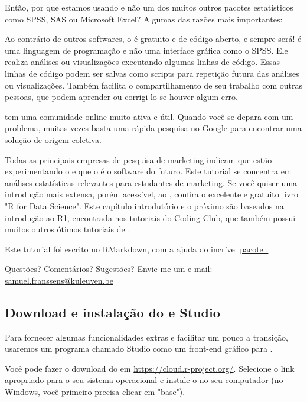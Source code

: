 \documentclass{article}
\begin{document}
Então, por que estamos usando \faRProject e não um dos muitos outros pacotes estatísticos como SPSS, SAS ou Microsoft Excel? Algumas das razões mais importantes:

Ao contrário de outros softwares, o \faRProject é gratuito e de código aberto, e sempre será!
\faRProject é uma linguagem de programação e não uma interface gráfica como o SPSS. Ele realiza análises ou visualizações executando algumas linhas de código. Essas linhas de código podem ser salvas como scripts para repetição futura das análises ou visualizações. Também facilita o compartilhamento de seu trabalho com outras pessoas, que podem aprender ou corrigi-lo se houver algum erro.

\faRProject tem uma comunidade online muito ativa e útil. Quando você se depara com um problema, muitas vezes basta uma rápida pesquisa no Google para encontrar uma solução de origem coletiva.


Todas as principais empresas de pesquisa de marketing indicam que estão experimentando o \faRProject e que o \faRProject é o software do futuro.
Este tutorial se concentra em análises estatísticas relevantes para estudantes de marketing. Se você quiser uma introdução mais extensa, porém acessível, ao \faRProject, confira o excelente e gratuito livro "\href{http://r4ds.had.co.nz/index.html}{R for Data Science}". Este capítulo introdutório e o próximo são baseados na introdução ao R1, encontrada nos tutoriais do \href{https://ourcodingclub.github.io/}{Coding Club}, que também possui muitos outros ótimos tutoriais de \faRProject.

Este tutorial foi escrito no RMarkdown, com a ajuda do incrível \href{https://bookdown.org/yihui/bookdown/}{pacote .}

Questões? Comentários? Sugestões? Envie-me um e-mail: \href{mailto:samuel.franssens@kuleuven.be}{samuel.franssens@kuleuven.be}

\subsection{Download e instalação do \faRProject e \faRProject Studio}

Para fornecer algumas funcionalidades extras e facilitar um pouco a transição, usaremos um programa chamado \faRProject Studio como um front-end gráfico para \faRProject.

Você pode fazer o download do \faRProject em \href{https://cloud.r-project.org/}{https://cloud.r-project.org/}. Selecione o link apropriado para o seu sistema operacional e instale o \faRProject no seu computador (no Windows, você primeiro precisa clicar em "base").
\end{document}
